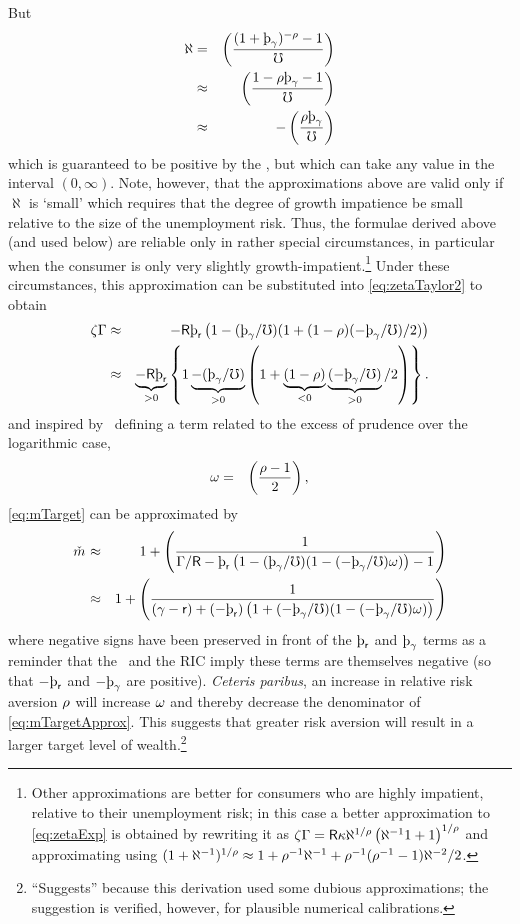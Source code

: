 \documentclass{handout}
\begin{document}
But
\begin{eqnarray}
  \label{eq:hatpi}
  \aleph & = & \left(\frac{(1+\patpGro)^{-\CRRA}-1}{\urate}\right)
\\ & \approx & \left(\frac{1- \CRRA \patpGro-1}{\urate}\right)
\\ & \approx & -\left(\frac{\CRRA \patpGro}{\urate}\right)
\end{eqnarray}
which is guaranteed to be positive by the \GICPGro, but which can take any value in the interval $(0,\infty)$.  Note, however, that the approximations above are valid only if $\aleph$ is `small' which requires that the degree of growth impatience be small relative to the size of the unemployment risk.  Thus, the formulae derived above (and used below) are reliable only in rather special circumstances, in particular when the consumer is only very slightly growth-impatient.\footnote{Other approximations are better for consumers who are highly impatient, relative to their unemployment risk; in this case a better approximation to \eqref{eq:zetaExp} is obtained by rewriting it as $\zeta\Gamma = \mathsf{R} \kappa \aleph^{1/\rho} \left(\aleph^{-1}1+1\right)^{1/\rho}$ and approximating using $(1+\aleph^{-1})^{1/\rho} \approx 1 + \rho^{-1}\aleph^{-1}+\rho^{-1}(\rho^{-1}-1)\aleph^{-2}/2$.}  Under these circumstances, this approximation can be substituted into \eqref{eq:zetaTaylor2} to obtain
\begin{eqnarray}
  \zeta\PGro & \approx &  -\Rfree \patr \left(1-(\patpGro/\urate)(1+(1-\CRRA)(-\patpGro/\urate)/2)\right)
\\ & \approx & \underbrace{-\Rfree \patr}_{>0} \left\{1\underbrace{-(\patpGro/\urate)}_{>0}\left(1+\underbrace{(1-\CRRA)}_{<0}\underbrace{(-\patpGro/\urate)}_{>0}/2\right)\right\} \label{eq:zetaGammaApprox}
.
\end{eqnarray}
and inspired by~\cite{kimball:smallandlarge} defining a term related to the excess of prudence
over the logarithmic case,
\begin{eqnarray}
  \omega & = & \left(\frac{\rho-1}{2}\right),
\end{eqnarray}
\eqref{eq:mTarget} can be approximated by
\begin{eqnarray}
 \mTarg^{\null} & \approx & 1 + \left(\frac{1}{\PGro/\Rfree-\patr \left(1-(\patpGro/\urate)(1-(-\patpGro/\urate)\prudEx) \right)-1}\right)
\\ & \approx & 1 + \left(\frac{1}{(\pGro-\rfree)+(-\patr) \left(1+(-\patpGro/\urate)(1-(-\patpGro/\urate)\prudEx)\right)}\right)
\label{eq:mTargetApprox}
\end{eqnarray}
where negative signs have been preserved in front of the $\patr$ and $\patpGro$ terms as a reminder that
the \GICPGro~and the RIC imply these terms are themselves negative (so that $-\patr$ and $-\patpGro$ are positive).
{\it Ceteris paribus}, an increase in relative risk aversion $\rho$ will increase $\omega$ and thereby decrease the denominator of \eqref{eq:mTargetApprox}.  This suggests that
greater risk aversion will result in a larger target level of wealth.\footnote{``Suggests'' because
this derivation used some dubious approximations; the suggestion is verified, however, for
plausible numerical calibrations.}
\end{document}
